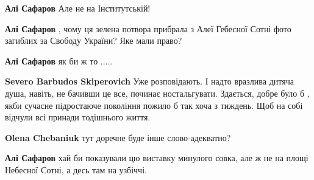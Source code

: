 \begin{itemize}
\begin{itemize}
\textbf{Алі Сафаров} Але не на Інститутській!

 
\textbf{Алі Сафаров} , чому ця зелена потвора прибрала з Алеї Гебесної Сотні фото загиблих за Свободу України? Яке мали право?

 
\textbf{Алі Сафаров} як би ж то .....

 
\textbf{Severo Barbudos Skiperovich} Уже розповідають. І надто вразлива дитяча душа, навіть, не бачивши це все, починає ностальгувати. Здається, добре було б , якби сучасне підростаюче покоління пожило б так хоча з тиждень. Щоб на собі відчули всі принади тодішнього життя.

 
\textbf{Olena Chebaniuk} тут доречне буде інше слово-адекватно?

 
\textbf{Алі Сафаров} хай би показували цю виставку минулого совка, але ж не на площі Небесної Сотні, а десь там на узбіччі.
\end{itemize}

 

\end{itemize}
